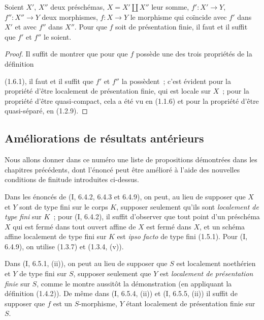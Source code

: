 \begin{proposition}[1.6.5]
\label{IV.1.6.5-fr}
Soient $X'$, $X''$ deux préschémas, $X=X'\amalg X''$ leur somme,
$f':X'\to Y$, $f'':X''\to Y$ deux morphismes, $f:X\to Y$ le morphisme qui
coïncide avec $f'$ dans $X'$ et avec $f''$ dans $X''$. Pour que $f$ soit de
présentation finie, il faut et il suffit que $f'$ et $f''$ le soient.
\end{proposition}

\par\medskip\noindent
\begin{proof}
Il suffit de montrer que pour que $f$ possède une des trois propriétés de la
définition


(1.6.1), il faut et il suffit que $f'$ et $f''$ la possèdent~; c'est évident
pour la propriété d'être localement de présentation finie, qui est locale sur
$X$~; pour la propriété d'être quasi-compact, cela a été vu en (1.1.6) et pour
la propriété d'être quasi-séparé, en (1.2.9).
\end{proof}

\subsection{Améliorations de résultats antérieurs}
\label{subsection:IV.1.7-fr}

Nous allons donner dans ce numéro une liste de propositions démontrées dans
les chapitres précédents, dont l'énoncé peut être amélioré à l'aide des
nouvelles conditions de finitude introduites ci-dessus.

\begin{env}[1.7.1]
\label{IV.1.7.1-fr}
Dans les énoncés de (I, 6.4.2, 6.4.3 et 6.4.9), on peut, au lieu de supposer
que $X$ et $Y$ sont de type fini sur le corps $K$, supposer seulement qu'ils
sont \emph{localement de type fini} sur $K$~; pour (I, 6.4.2), il suffit
d'observer que tout point d'un préschéma $X$ qui est fermé dans tout ouvert
affine de $X$ est fermé dans $X$, et un schéma affine localement de type fini
sur $K$ est \emph{ipso facto} de type fini (1.5.1). Pour (I, 6.4.9), on utilise
(1.3.7) et (1.3.4, (v)).
\end{env}

\begin{env}[1.7.2]
\label{IV.1.7.2-fr}
Dans (I, 6.5.1, (ii)), on peut au lieu de supposer que $S$ est localement
noethérien et $Y$ de type fini sur $S$, supposer seulement que $Y$ est
\emph{localement de présentation finie} sur $S$, comme le montre aussitôt la
démonstration (en appliquant la définition (1.4.2)). De même dans (I, 6.5.4,
(ii)) et (I, 6.5.5, (ii)) il suffit de supposer que $f$ est un $S$-morphisme,
$Y$ étant localement de présentation finie sur $S$.
\end{env}

